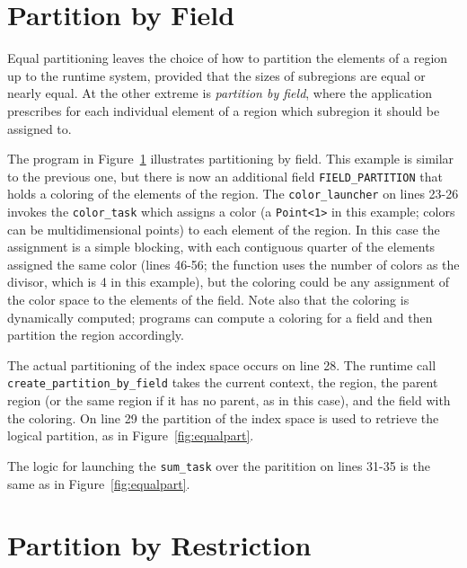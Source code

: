 \section{Partition by Field}
\label{sec:pbf}

Equal partitioning leaves the choice of how to partition the elements of a region
up to the runtime system, provided that the sizes of subregions are
equal or nearly equal.  At the other extreme is {\em partition by field}, where
the application prescribes for each individual element of a region which subregion it should be assigned to.

The program in Figure~\ref{fig:pbf} illustrates partitioning by field.  This example is similar to the previous one,
but there is now an additional field {\tt FIELD\_PARTITION} that holds a coloring of the elements of the region.
The {\tt color\_launcher} on lines 23-26 invokes the {\tt color\_task} which assigns a color (a {\tt Point<1>} in this example; colors can be multidimensional points) to each
element of the region.  In this case the assignment is a simple blocking, with each contiguous quarter of the elements assigned the same
color (lines 46-56; the function uses the number of colors as the divisor, which is 4 in this example), but the coloring could be any assignment of the color space to the elements of the field.  Note also that the
coloring is dynamically computed; programs can compute a coloring for a field and then partition the region accordingly.

The actual partitioning of the index space occurs on line 28.  The runtime call {\tt create\_partition\_by\_field} takes the current
context, the region, the parent region (or the same region if it has no parent, as in this case), and the field with the coloring.
On line 29 the partition of the index space is used to retrieve the logical partition, as in Figure~\ref{fig:equalpart}.

The logic for launching the {\tt sum\_task} over the paritition on lines 31-35 is the same as in Figure~\ref{fig:equalpart}.

\begin{figure}
  {\small
   
  }
  \caption{}
  \label{fig:pbf}
\end{figure}

\section{Partition by Restriction}
\label{sec:pbr}

